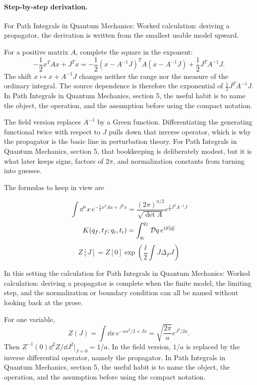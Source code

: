 \paragraph{Step-by-step derivation.}

For Path Integrals in Quantum Mechanics: Worked calculation: deriving a propagator, the derivation is written from the smallest usable model upward.

For a positive matrix \(A\), complete the square in the exponent:
\[
  -\frac12x^TAx+J^Tx
  =
  -\frac12(x-A^{-1}J)^TA(x-A^{-1}J)
  +\frac12J^TA^{-1}J.
\]
The shift \(x\mapsto x+A^{-1}J\) changes neither the range nor the measure of the ordinary integral.  The source dependence is therefore the exponential of \(\frac12J^TA^{-1}J\).  In Path Integrals in Quantum Mechanics, section 5, the useful habit is to name the object, the operation, and the assumption before using the compact notation.

The field version replaces \(A^{-1}\) by a Green function.  Differentiating the generating functional twice with respect to \(J\) pulls down that inverse operator, which is why the propagator is the basic line in perturbation theory.  For Path Integrals in Quantum Mechanics, section 5, that bookkeeping is deliberately modest, but it is what later keeps signs, factors of \(2\pi\), and normalization constants from turning into guesses.

The formulas to keep in view are

\[
  \int\dd^n x\,e^{-\frac12x^TAx+J^Tx}=\frac{(2\pi)^{n/2}}{\sqrt{\det A}}e^{\frac12J^TA^{-1}J}
\]
\[
  K(q_f,t_f;q_i,t_i)=\int_{q_i}^{q_f}\mathcal D q\,e^{\mathrm i S[q]}
\]
\[
  Z[J]=Z[0]\exp\left(\frac{\ii}{2}\int J\Delta_FJ\right)
\]

In this setting the calculation for Path Integrals in Quantum Mechanics: Worked calculation: deriving a propagator is complete when the finite model, the limiting step, and the normalization or boundary condition can all be named without looking back at the prose.




\begin{example}
For one variable,
\[
  Z(J)=\int\dd x\,e^{-ax^2/2+Jx}
  =\sqrt{\frac{2\pi}{a}}e^{J^2/2a}.
\]
Then \(Z^{-1}(0)\dd^2Z/\dd J^2|_{J=0}=1/a\).  In the field version, \(1/a\) is replaced by the inverse differential operator, namely the propagator.  In Path Integrals in Quantum Mechanics, section 5, the useful habit is to name the object, the operation, and the assumption before using the compact notation.
\end{example}



